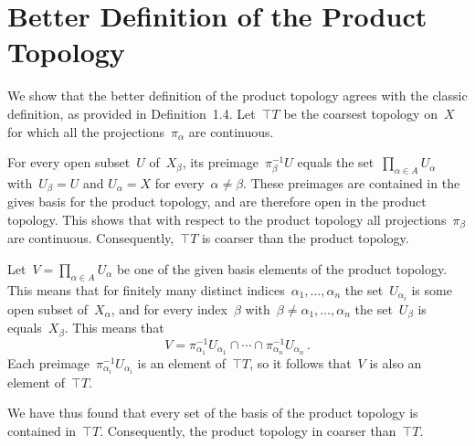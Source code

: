 \section{Better Definition of the Product Topology}

We show that the better definition of the product topology agrees with the classic definition, as provided in Definition~1.4.
Let~$\top{T}$ be the coarsest topology on~$X$ for which all the projections~$π_α$ are continuous.

For every open subset~$U$ of~$X_β$, its preimage~$π_β^{-1} U$ equals the set~$∏_{α ∈ A} U_α$ with~$U_β = U$ and $U_α = X$ for every~$α ≠ β$.
These preimages are contained in the gives basis for the product topology, and are therefore open in the product topology.
This shows that with respect to the product topology all projections~$π_β$ are continuous.
Consequently,~$\top{T}$ is coarser than the product topology.

Let~$V = ∏_{α ∈ A} U_α$ be one of the given basis elements of the product topology.
This means that for finitely many distinct indices~$α_1, \dotsc, α_n$ the set~$U_{α_i}$ is some open subset of~$X_α$, and for every index~$β$ with~$β ≠ α_1, \dotsc, α_n$ the set~$U_β$ is equals~$X_β$.
This means that
\[
	V = π_{α_1}^{-1} U_{α_1} ∩ \dotsb ∩ π_{α_n}^{-1} U_{α_n} \,.
\]
Each preimage~$π_{α_i}^{-1} U_{α_i}$ is an element of~$\top{T}$, so it follows that~$V$ is also an element of~$\top{T}$.

We have thus found that every set of the basis of the product topology is contained in~$\top{T}$.
Consequently, the product topology in coarser than~$\top{T}$.
